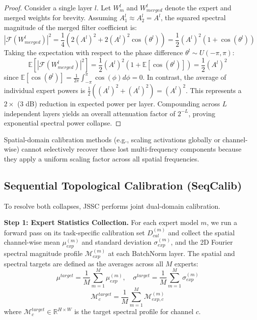 \documentclass{article}
\begin{document}
\begin{proof}
Consider a single layer $l$. Let $W^l_m$ and $W^l_{merged}$ denote the expert and merged weights for brevity. Assuming $A^l_1 \approx A^l_2 = A^l$, the squared spectral magnitude of the merged filter coefficient is:
\begin{equation}
    |\mathcal{F}(W^l_{merged})|^2 = \frac{1}{4} \left( 2(A^l)^2 + 2(A^l)^2 \cos(\theta^l) \right) = \frac{1}{2}(A^l)^2 (1 + \cos(\theta^l))
\end{equation}
Taking the expectation with respect to the phase difference $\theta^l \sim U(-\pi, \pi)$:
\begin{equation}
    \mathbb{E}[|\mathcal{F}(W^l_{merged})|^2] = \frac{1}{2}(A^l)^2 (1 + \mathbb{E}[\cos(\theta^l)]) = \frac{1}{2}(A^l)^2
\end{equation}
since $\mathbb{E}[\cos(\theta^l)] = \frac{1}{2\pi} \int_{-\pi}^{\pi} \cos(\phi) d\phi = 0$.
In contrast, the average of individual expert powers is $\frac{1}{2} ((A^l)^2 + (A^l)^2) = (A^l)^2$. This represents a $2\times$ (3 dB) reduction in expected power per layer. Compounding across $L$ independent layers yields an overall attenuation factor of $2^{-L}$, proving exponential spectral power collapse.
\end{proof}

Spatial-domain calibration methods (e.g., scaling activations globally or channel-wise) cannot selectively recover these lost multi-frequency components because they apply a uniform scaling factor across all spatial frequencies.

\subsection{Sequential Topological Calibration (SeqCalib)}
To resolve both collapses, JSSC performs joint dual-domain calibration.

\textbf{Step 1: Expert Statistics Collection.} For each expert model $m$, we run a forward pass on its task-specific calibration set $D_{cal}^{(m)}$ and collect the spatial channel-wise mean $\mu_{exp}^{(m)}$ and standard deviation $\sigma_{exp}^{(m)}$, and the 2D Fourier spectral magnitude profile $\mathcal{M}_{exp}^{(m)}$ at each BatchNorm layer.
The spatial and spectral targets are defined as the averages across all $M$ experts:
\begin{equation}
    \mu^{target} = \frac{1}{M} \sum_{m=1}^M \mu_{exp}^{(m)}, \quad \sigma^{target} = \frac{1}{M} \sum_{m=1}^M \sigma_{exp}^{(m)}
\end{equation}
\begin{equation}
    \mathcal{M}^{target}_{c} = \frac{1}{M} \sum_{m=1}^M \mathcal{M}_{exp, c}^{(m)}
\end{equation}
where $\mathcal{M}^{target}_{c} \in \mathbb{R}^{H \times W}$ is the target spectral profile for channel $c$.
\end{document}
